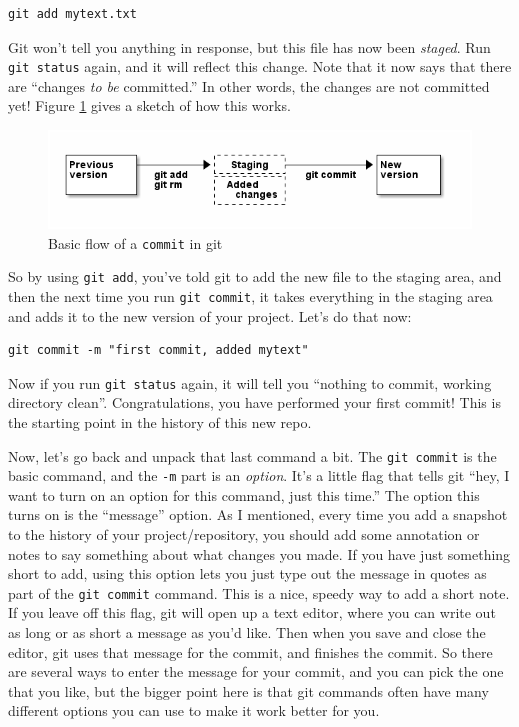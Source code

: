 \documentclass{article}
\begin{document}
\begin{verbatim}
git add mytext.txt
\end{verbatim}

Git won't tell you anything in response, but this file has now been \emph{staged}. Run \texttt{git status} again, and it will reflect this change.  Note that it now says that there are ``changes \emph{to be} committed.''  In other words, the changes are not committed yet! Figure \ref{fig-flow} gives a sketch of how this works.



\begin{figure}[h!]
\caption{Basic flow of a \texttt{commit} in git}
\label{fig-flow}
\centering
\includegraphics[width=4.5in]{commitflow1.png}
\end{figure}

So by using \texttt{git add}, you've told git to add the new file to the staging area, and then the next time you run \texttt{git commit}, it takes everything in the staging area and adds it to the new version of your project.  Let's do that now:


\begin{verbatim}
git commit -m "first commit, added mytext"
\end{verbatim}

Now if you run \texttt{git status} again, it will tell you ``nothing to commit, working directory clean''.  Congratulations, you have performed your first commit!  This is the starting point in the history of this new repo. 

Now, let's go back and unpack that last command a bit. The \texttt{git commit} is the basic command, and the \texttt{-m} part is an \emph{option}. It's a little flag that tells git ``hey, I want to turn on an option for this command, just this time.''  The option this turns on is the ``message'' option. As I mentioned, every time you add a snapshot to the history of your project/repository, you should add some annotation or notes to say something about what changes you made. If you have just something short to add, using this option lets you just type out the message in quotes as part of the \texttt{git commit} command.  This is a nice, speedy way to add a short note.  If you leave off this flag, git will open up a text editor, where you can write out as long or as short a message as you'd like.  Then when you save and close the editor, git uses that message for the commit, and finishes the commit.  So there are several ways to enter the message for your commit, and you can pick the one that you like, but the bigger point here is that git commands often have many different options you can use to make it work better for you.
\end{document}
